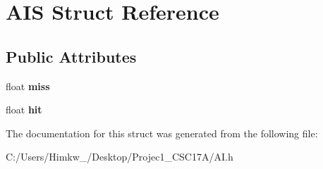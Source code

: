 \hypertarget{struct_a_i_s}{\section{A\+I\+S Struct Reference}
\label{struct_a_i_s}
}
\subsection*{Public Attributes}
\begin{DoxyCompactItemize}
\item 
\hypertarget{struct_a_i_s_a9621821762eec63efc30382eb046cb91}{float {\bfseries miss}}\label{struct_a_i_s_a9621821762eec63efc30382eb046cb91}

\item 
\hypertarget{struct_a_i_s_a180f45a176d811f979e1bf0b94b250d3}{float {\bfseries hit}}\label{struct_a_i_s_a180f45a176d811f979e1bf0b94b250d3}

\end{DoxyCompactItemize}


The documentation for this struct was generated from the following file\+:\begin{DoxyCompactItemize}
\item 
C\+:/\+Users/\+Himkw\+\_/\+Desktop/\+Projec1\+\_\+\+C\+S\+C17\+A/A\+I.\+h\end{DoxyCompactItemize}
